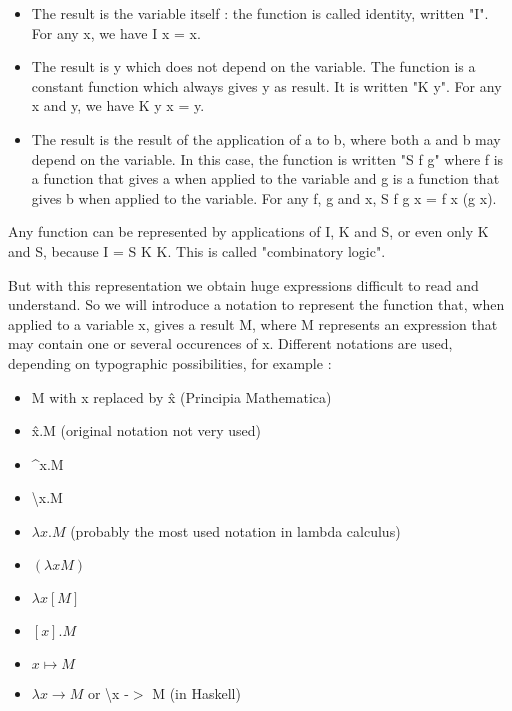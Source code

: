 \documentclass[10pt]{article}
\begin{document}
\begin{itemize}
     \setlength{\itemsep}{1pt}
     \setlength{\parskip}{0pt}
     \setlength{\parsep}{0pt}

\item The result is the variable itself : the function is called identity, written "I". For any x, we have I x = x.

\item The result is y which does not depend on the variable. The function is a constant function which always gives y as result. It is written "K y". For any x and y, we have K y x = y.

\item The result is the result of the application of a to b, where both a and b may depend on the variable. In this case, the function is written "S f g" where f is a function that gives a when applied to the variable and g is a function that gives b when applied to the variable. For any f, g and x, S f g x = f x (g x).

\end{itemize}

Any function can be represented by applications of I, K and S, or even only K and S, because I = S K K. This is called "combinatory logic".

But with this representation we obtain huge expressions difficult to read and understand. So we will introduce a notation to represent the function that, when applied to a variable x, gives a result M, where M represents an expression that may contain one or several occurences of x. Different notations are used, depending on typographic possibilities, for example :

\begin{itemize}
     \setlength{\itemsep}{1pt}
     \setlength{\parskip}{0pt}
     \setlength{\parsep}{0pt}

\item M with x replaced by \^x (Principia Mathematica)
\item \^x.M (original notation not very used)
\item \^{}x.M
\item \textbackslash x.M
\item \( \lambda x . M \) (probably the most used notation in lambda calculus)
\item \( (\lambda x M) \)
\item \( \lambda x [M]  \)
\item \( [x].M \)
\item \( x \mapsto M \)
\item \( \lambda x \rightarrow M \) or \textbackslash x -$>$ M  (in Haskell)

\end{itemize}
\end{document}
